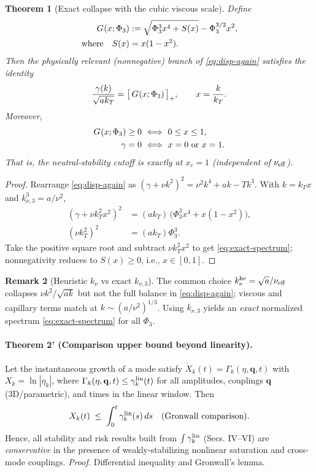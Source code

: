\documentclass[aps,pre,twocolumn,showpacs,superscriptaddress]{revtex4-2}
\newtheorem{theorem}{Theorem}
\theoremstyle{definition}
\newtheorem{remark}[theorem]{Remark}
\begin{document}
\begin{theorem}[Exact collapse with the cubic viscous scale]\label{thm:exact-collapse}
Define
\begin{align}\label{eq:Gstar}
G_{\*}(x;\Phi_3)&:=\sqrt{\Phi_3^3 x^4 + S(x)} - \Phi_3^{3/2} x^2,\\
\text{where}\quad S(x)&=x(1-x^2).\nonumber
\end{align}
Then the physically relevant (nonnegative) branch of \eqref{eq:disp-again} satisfies the identity
\begin{equation}\label{eq:exact-spectrum}
\frac{\gamma(k)}{\sqrt{a k_T}}=\big[\,G_{\*}(x;\Phi_3)\,\big]_+,\qquad x=\frac{k}{k_T}.
\end{equation}
Moreover,
\begin{align}
G_{\*}(x;\Phi_3)\ge 0 &\ \Longleftrightarrow\ 0\le x\le 1,\\
\gamma=0 &\ \Longleftrightarrow\ x=0\ \text{or}\ x=1.\nonumber
\end{align}
That is, the neutral‑stability \emph{cutoff is exactly} at $x_c=1$ (independent of $\nu_{\rm eff}$).
\end{theorem}

\begin{proof}
Rearrange \eqref{eq:disp-again} as $(\gamma+\nu k^2)^2=\nu^2 k^4 + a k - T k^3$. With $k=k_T x$ and $k_{\nu,3}^3=a/\nu^2$,
\begin{align}
(\gamma+\nu k_T^2 x^2)^2 &=(a k_T)\,\Big(\Phi_3^3 x^4 + x(1-x^2)\Big),\\
(\nu k_T^2)^2 &=(a k_T)\Phi_3^3.\nonumber
\end{align}
Take the positive square root and subtract $\nu k_T^2 x^2$ to get \eqref{eq:exact-spectrum}; nonnegativity reduces to $S(x)\ge 0$, i.e., $x\in[0,1]$.
\end{proof}

\begin{remark}[Heuristic $k_\nu$ vs exact $k_{\nu,3}$]\label{rem:knu-compare}
The common choice $k_\nu^{\rm he}=\sqrt{a}/\nu_{\rm eff}$ collapses $\nu k^2/\sqrt{ak}$ but not the full balance in \eqref{eq:disp-again}; viscous and capillary terms match at $k\sim (a/\nu^2)^{1/3}$. Using $k_{\nu,3}$ yields an \emph{exact} normalized spectrum \eqref{eq:exact-spectrum} for all $\Phi_3$.
\end{remark}

\paragraph*{Theorem 2' (Comparison upper bound beyond linearity).}
Let the instantaneous growth of a mode satisfy $\dot X_k(t)=\Gamma_k(\eta,\mathbf{q},t)$ with $X_k=\ln|\eta_k|$, where $\Gamma_k(\eta,\mathbf{q},t)\le\gamma_k^{\rm lin}(t)$ for all amplitudes, couplings $\mathbf{q}$ (3D/parametric), and times in the linear window. Then
\[
X_k(t)\;\le\;\int_0^t \gamma_k^{\rm lin}(s)\,ds\quad(\text{Gronwall comparison}).
\]
Hence, all stability and risk results built from $\int\gamma_k^{\rm lin}$ (Secs. IV–VI) are \emph{conservative} in the presence of weakly-stabilizing nonlinear saturation and cross-mode couplings.
\emph{Proof.} Differential inequality and Gronwall's lemma.
\end{document}
